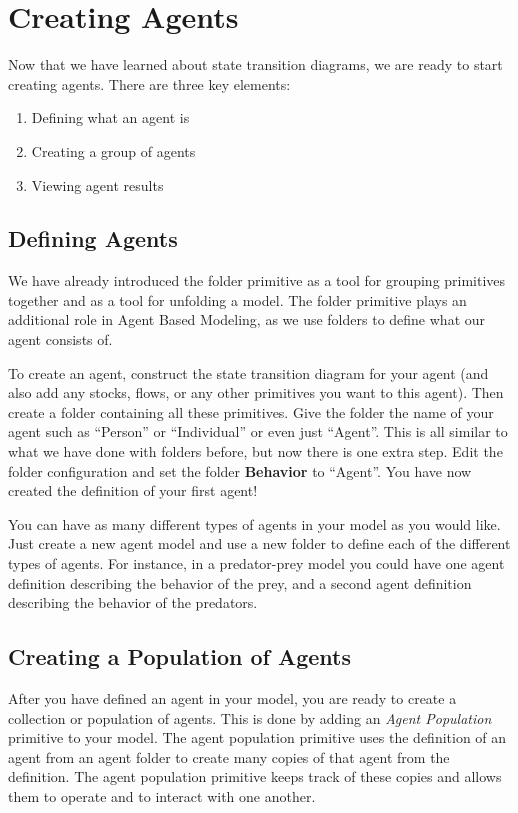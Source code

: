 \documentclass[]{memoir}
\renewcommand{\u}[1]{\textbf{#1}}
\begin{document}
\section{Creating Agents}

Now that we have learned about state transition diagrams, we are ready
to start creating agents. There are three key elements:

\begin{enumerate}
\def\labelenumi{\arabic{enumi}.}
\itemsep1pt\parskip0pt
\item
  Defining what an agent is
\item
  Creating a group of agents
\item
  Viewing agent results
\end{enumerate}

\subsection{Defining Agents}

We have already introduced the folder primitive as a tool for grouping
primitives together and as a tool for unfolding a model. The folder
primitive plays an additional role in Agent Based Modeling, as we use
folders to define what our agent consists of.

To create an agent, construct the state transition diagram for your
agent (and also add any stocks, flows, or any other primitives you want
to this agent). Then create a folder containing all these primitives.
Give the folder the name of your agent such as ``Person'' or
``Individual'' or even just ``Agent''. This is all similar to what we
have done with folders before, but now there is one extra step. Edit the
folder configuration and set the folder \u{Behavior} to ``Agent''. You
have now created the definition of your first agent!

You can have as many different types of agents in your model as you
would like. Just create a new agent model and use a new folder to define
each of the different types of agents. For instance, in a predator-prey
model you could have one agent definition describing the behavior of the
prey, and a second agent definition describing the behavior of the
predators.

\subsection{Creating a Population of Agents}

After you have defined an agent in your model, you are ready to create a
collection or population of agents. This is done by adding an
\emph{Agent Population} primitive to your model. The agent population
primitive uses the definition of an agent from an agent folder to create
many copies of that agent from the definition. The agent population
primitive keeps track of these copies and allows them to operate and to
interact with one another.
\end{document}
